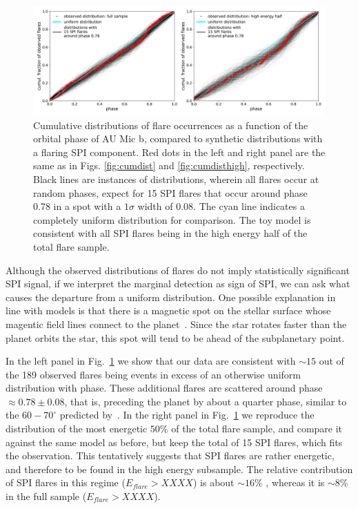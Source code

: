 \documentclass[fleqn,usenatbib,letters]{mnras}%
\begin{document}
\begin{figure}
\includegraphics[width=\hsize]{figures/2021_06_10_speculative_SPI_spot.png} 
\caption{Cumulative distributions of flare occurrences as a function of the orbital phase of AU Mic b, compared to synthetic distributions with a flaring SPI component. Red dots in the left and right panel are the same as in Figs. \ref{fig:cumdist} and \ref{fig:cumdisthigh}, respectively. Black lines are instances of distributions, wherein all flares occur at random phases, expect for 15 SPI flares that occur around phase 0.78 in a spot with a $1\sigma$ width of 0.08. The cyan line indicates a completely uniform distribution for comparison. The toy model is consistent with all SPI flares being in the high energy half of the total flare sample.}
\label{fig:speculative}
\end{figure}



Although the observed distributions of flares do not imply statistically significant SPI signal, if we interpret the marginal detection as sign of SPI, we can ask what causes the departure from a uniform distribution. One possible explanation in line with models is that there is a magnetic spot on the stellar surface whose magentic field lines connect to the planet~\citep{lanza2018, strugarek2019}. Since the star rotates faster than the planet orbits the star, this spot will tend to be ahead of the subplanetary point. 

In the left panel in Fig.~\ref{fig:speculative} we show that our data are consistent with $\sim 15$ out of the 189 observed flares being events in excess of an otherwise uniform distribution with phase. These additional flares are scattered around phase$\approx 0.78\pm0.08$, that is, preceding the planet by about a quarter phase, similar to the $60-70^\circ$ predicted by~\citet{lanza2008}. In the right panel in Fig.~\ref{fig:speculative} we reproduce the distribution of the most energetic $50\%$ of the total flare sample, and compare it against the same model as before, but keep the total of 15 SPI flares, which fits the observation. This tentatively suggests that SPI flares are rather energetic, and therefore to be found in the high energy subsample. The relative contribution of SPI flares in this regime ($E_{flare}>XXXX$) is about $\sim16\%$ , whereas it is $\sim8\%$ in the full sample ($E_{flare}>XXXX$). 
\end{document}

